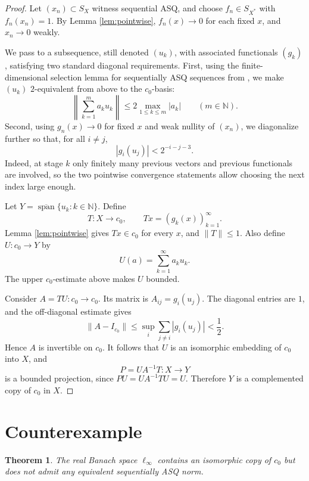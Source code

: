 \documentclass[11pt]{article}
\newtheorem{theorem}{Theorem}
\newcommand{\N}{\mathbb N}
\begin{document}
\begin{proof}
Let \((x_n)\subset S_X\) witness sequential ASQ, and choose
\(f_n\in S_{X^*}\) with \(f_n(x_n)=1\).  By Lemma \ref{lem:pointwise},
\(f_n(x)\to0\) for each fixed \(x\), and \(x_n\to0\) weakly.

We pass to a subsequence, still denoted \((u_k)\), with associated
functionals \((g_k)\), satisfying two standard diagonal requirements.
First, using the finite-dimensional selection lemma for sequentially ASQ
sequences from \cite[Lemma 3.2]{AMRZ}, we make \((u_k)\) \(2\)-equivalent
from above to the \(c_0\)-basis:
\[
        \left\|\sum_{k=1}^m a_k u_k\right\|
        \leq 2\max_{1\leq k\leq m}|a_k|
        \qquad(m\in\N).
\]
Second, using \(g_n(x)\to0\) for fixed \(x\) and weak nullity of \((x_n)\), we
diagonalize further so that, for all \(i\neq j\),
\[
        |g_i(u_j)| < 2^{-i-j-3}.
\]
Indeed, at stage \(k\) only finitely many previous vectors and previous
functionals are involved, so the two pointwise convergence statements allow
choosing the next index large enough.

Let \(Y=\overline{\operatorname{span}}\{u_k:k\in\N\}\).  Define
\[
        T:X\longrightarrow c_0,\qquad T x=(g_k(x))_{k=1}^\infty.
\]
Lemma \ref{lem:pointwise} gives \(T x\in c_0\) for every \(x\), and
\(\|T\|\leq1\).  Also define \(U:c_0\to Y\) by
\[
        U(a)=\sum_{k=1}^\infty a_k u_k .
\]
The upper \(c_0\)-estimate above makes \(U\) bounded.

Consider \(A=TU:c_0\to c_0\).  Its matrix is \(A_{ij}=g_i(u_j)\).  The
diagonal entries are \(1\), and the off-diagonal estimate gives
\[
        \|A-I_{c_0}\|
        \leq \sup_i \sum_{j\neq i}|g_i(u_j)|
        <\frac12.
\]
Hence \(A\) is invertible on \(c_0\).  It follows that \(U\) is an isomorphic
embedding of \(c_0\) into \(X\), and
\[
        P=U A^{-1}T:X\longrightarrow Y
\]
is a bounded projection, since \(P U=U A^{-1}TU=U\).  Therefore \(Y\) is a
complemented copy of \(c_0\) in \(X\).
\end{proof}

\section*{Counterexample}

\begin{theorem}
The real Banach space \(\ell_\infty\) contains an isomorphic copy of \(c_0\)
but does not admit any equivalent sequentially ASQ norm.
\end{theorem}
\end{document}
